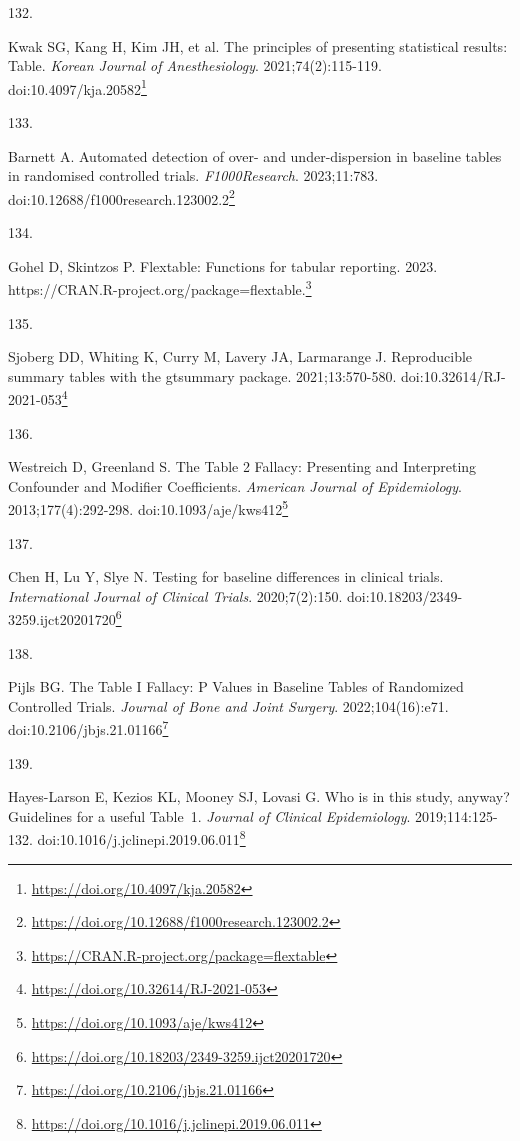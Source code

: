 \documentclass[
  a4paper,
]{book}
\newlength{\cslhangindent}
\newlength{\csllabelwidth}
\newlength{\cslentryspacingunit} %
\newenvironment{CSLReferences}[2] %
 {%
  \setlength{\parindent}{0pt}
  \ifodd #1
  \let\oldpar\par
  \def\par{\hangindent=\cslhangindent\oldpar}
  \fi
  \setlength{\parskip}{#2\cslentryspacingunit}
 }%
 {}
\newcommand{\CSLLeftMargin}[1]{\parbox[t]{\csllabelwidth}{#1}}
\newcommand{\CSLRightInline}[1]{\parbox[t]{\linewidth - \csllabelwidth}{#1}\break}
\renewcommand{\href}[2]{#2\footnote{\url{#1}}}
\begin{document}
\begin{CSLReferences}{0}{0}
\leavevmode{}%
\CSLLeftMargin{132. }%
\CSLRightInline{Kwak SG, Kang H, Kim JH, et al. The principles of presenting statistical results: Table. \emph{Korean Journal of Anesthesiology}. 2021;74(2):115-119. doi:\href{https://doi.org/10.4097/kja.20582}{10.4097/kja.20582}}

\leavevmode{}%
\CSLLeftMargin{133. }%
\CSLRightInline{Barnett A. Automated detection of over- and under-dispersion in baseline tables in randomised controlled trials. \emph{F1000Research}. 2023;11:783. doi:\href{https://doi.org/10.12688/f1000research.123002.2}{10.12688/f1000research.123002.2}}

\leavevmode{}%
\CSLLeftMargin{134. }%
\CSLRightInline{Gohel D, Skintzos P. Flextable: Functions for tabular reporting. 2023. \href{https://CRAN.R-project.org/package=flextable}{https://CRAN.R-project.org/package=flextable.}}

\leavevmode{}%
\CSLLeftMargin{135. }%
\CSLRightInline{Sjoberg DD, Whiting K, Curry M, Lavery JA, Larmarange J. Reproducible summary tables with the gtsummary package. 2021;13:570-580. doi:\href{https://doi.org/10.32614/RJ-2021-053}{10.32614/RJ-2021-053}}

\leavevmode{}%
\CSLLeftMargin{136. }%
\CSLRightInline{Westreich D, Greenland S. The Table 2 Fallacy: Presenting and Interpreting Confounder and Modifier Coefficients. \emph{American Journal of Epidemiology}. 2013;177(4):292-298. doi:\href{https://doi.org/10.1093/aje/kws412}{10.1093/aje/kws412}}

\leavevmode{}%
\CSLLeftMargin{137. }%
\CSLRightInline{Chen H, Lu Y, Slye N. Testing for baseline differences in clinical trials. \emph{International Journal of Clinical Trials}. 2020;7(2):150. doi:\href{https://doi.org/10.18203/2349-3259.ijct20201720}{10.18203/2349-3259.ijct20201720}}

\leavevmode{}%
\CSLLeftMargin{138. }%
\CSLRightInline{Pijls BG. The Table I Fallacy: P Values in Baseline Tables of Randomized Controlled Trials. \emph{Journal of Bone and Joint Surgery}. 2022;104(16):e71. doi:\href{https://doi.org/10.2106/jbjs.21.01166}{10.2106/jbjs.21.01166}}

\leavevmode{}%
\CSLLeftMargin{139. }%
\CSLRightInline{Hayes-Larson E, Kezios KL, Mooney SJ, Lovasi G. Who is in this study, anyway? Guidelines for a useful Table~1. \emph{Journal of Clinical Epidemiology}. 2019;114:125-132. doi:\href{https://doi.org/10.1016/j.jclinepi.2019.06.011}{10.1016/j.jclinepi.2019.06.011}}


\end{CSLReferences}
\end{document}
